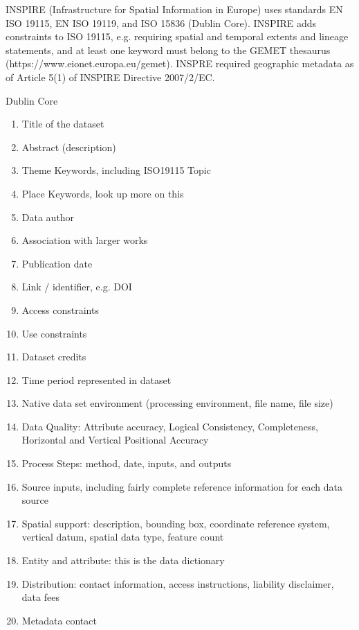 \documentclass{isprs} %
\begin{document}
INSPIRE (Infrastructure for Spatial Information in Europe) uses standards EN ISO 19115, EN ISO 19119, and ISO 15836 (Dublin
Core). INSPIRE adds constraints to ISO 19115, e.g. requiring spatial and temporal extents and lineage statements, and at least one keyword must belong to the GEMET thesaurus (https://www.eionet.europa.eu/gemet). INSPRE required geographic metadata as of Article 5(1) of INSPIRE Directive 2007/2/EC.

Dublin Core

\begin{enumerate}
\setlength\itemsep{0em}\setlength\parskip{0em}\setlength\topsep{0em}\setlength\partopsep{0em}\setlength\parsep{0em} 
\item{Title of the dataset} 
\item{Abstract (description)}
\item{Theme Keywords, including ISO19115 Topic}
\item{Place Keywords, look up more on this}
\item{Data author}
\item{Association with larger works}
\item{Publication date}
\item{Link / identifier, e.g. DOI}
\item{Access constraints}
\item{Use constraints}
\item{Dataset credits}
\item{Time period represented in dataset}
\item{Native data set environment (processing environment, file name, file size)}
\item{Data Quality: Attribute accuracy, Logical Consistency, Completeness, Horizontal and Vertical Positional Accuracy}
\item{Process Steps: method, date, inputs, and outputs}
\item{Source inputs, including fairly complete reference information for each data source}
\item{Spatial support: description, bounding box, coordinate reference system, vertical datum, spatial data type, feature count}
\item{Entity and attribute: this is the data dictionary}
\item{Distribution: contact information, access instructions, liability disclaimer, data fees}
\item{Metadata contact}
\end{enumerate}
\end{document}
